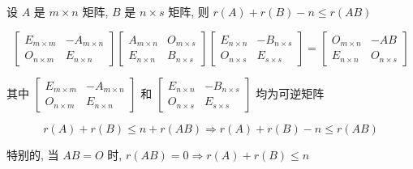 \begin{proposition}
	设 $A$ 是 $m\times n$ 矩阵, $B$ 是 $n\times s$ 矩阵, 则 $r(A) + r(B) - n \leq r(AB)$
\end{proposition}
\begin{anymark}[证明]

	$$\begin{bmatrix}
		E_{m\times m} & -A_{m\times n}\\
		O_{n\times m} & E_{n\times n}
	\end{bmatrix} 
	\begin{bmatrix}
		A_{m\times n} & O_{m\times s}\\
		E_{n\times n} & B_{n\times s}
	\end{bmatrix}
	\begin{bmatrix}
		E_{n\times n} & -B_{n\times s}\\
		O_{n\times s} & E_{s\times s}
	\end{bmatrix} = 
	\begin{bmatrix}
		O_{m\times n} & -AB \\
		E_{n\times n} & O_{n\times s}
	\end{bmatrix}$$

	其中 $\begin{bmatrix}
		E_{m\times m} & -A_{m\times n}\\
		O_{n\times m} & E_{n\times n}
	\end{bmatrix}$ 和 $\begin{bmatrix}
		E_{n\times n} & -B_{n\times s}\\
		O_{n\times s} & E_{s\times s}
	\end{bmatrix}$ 均为可逆矩阵
	
	$$r(A) + r(B) \leq n + r(AB) \Rightarrow r(A) + r(B) -n \leq r(AB)$$

	特别的, 当 $AB = O$ 时, $r(AB) = 0\Rightarrow r(A) + r(B) \leq n$ 
\end{anymark}

